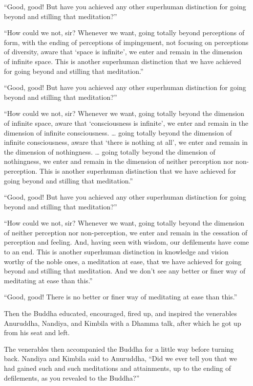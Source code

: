 \documentclass[12pt,openany]{book}%
\begin{document}
“Good, good! But have you achieved any other superhuman distinction for going beyond and stilling that meditation?” 

“How could we not, sir? Whenever we want, going totally beyond perceptions of form, with the ending of perceptions of impingement, not focusing on perceptions of diversity, aware that ‘space is infinite’, we enter and remain in the dimension of infinite space. This is another superhuman distinction that we have achieved for going beyond and stilling that meditation.” 

“Good, good! But have you achieved any other superhuman distinction for going beyond and stilling that meditation?” 

“How could we not, sir? Whenever we want, going totally beyond the dimension of infinite space, aware that ‘consciousness is infinite’, we enter and remain in the dimension of infinite consciousness. … going totally beyond the dimension of infinite consciousness, aware that ‘there is nothing at all’, we enter and remain in the dimension of nothingness. … going totally beyond the dimension of nothingness, we enter and remain in the dimension of neither perception nor non-perception. This is another superhuman distinction that we have achieved for going beyond and stilling that meditation.” 

“Good, good! But have you achieved any other superhuman distinction for going beyond and stilling that meditation?” 

“How could we not, sir? Whenever we want, going totally beyond the dimension of neither perception nor non-perception, we enter and remain in the cessation of perception and feeling. And, having seen with wisdom, our defilements have come to an end. This is another superhuman distinction in knowledge and vision worthy of the noble ones, a meditation at ease, that we have achieved for going beyond and stilling that meditation. And we don’t see any better or finer way of meditating at ease than this.” 

“Good, good! There is no better or finer way of meditating at ease than this.” 

Then the Buddha educated, encouraged, fired up, and inspired the venerables Anuruddha, Nandiya, and Kimbila with a Dhamma talk, after which he got up from his seat and left. 

The venerables then accompanied the Buddha for a little way before turning back. Nandiya and Kimbila said to Anuruddha, “Did we ever tell you that we had gained such and such meditations and attainments, up to the ending of defilements, as you revealed to the Buddha?” 
\end{document}
